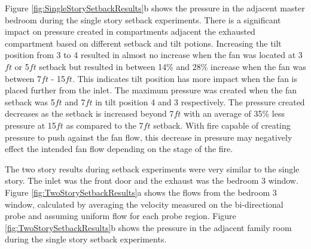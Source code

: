 \documentclass{article}
\begin{document}
Figure \ref{fig:SingleStorySetbackResults}b shows the pressure in the adjacent master bedroom during the single story setback experiments. There is a significant impact on pressure created in compartments adjacent the exhausted compartment based on different setback and tilt potions. Increasing the tilt position from 3 to 4 resulted in almost no increase when the fan was located at 3$ft$ or 5$ft$ setback but resulted in between 14\% and 28\% increase when the fan was between 7$ft$ - 15$ft$. This indicates tilt position has more impact when the fan is placed further from the inlet. The maximum pressure was created when the fan setback was 5$ft$ and 7$ft$ in tilt position 4 and 3 respectively. The pressure created decreases as the setback is increased beyond 7$ft$ with an average of 35\% less pressure at 15$ft$ as compared to the 7$ft$ setback. With fire capable of creating pressure to push against the fan flow, this decrease in pressure may negatively effect the intended fan flow depending on the stage of the fire. 

The two story results during setback experiments were very similar to the single story. The inlet was the front door and the exhaust was the bedroom 3 window. Figure \ref{fig:TwoStorySetbackResults}a shows the flows from the bedroom 3 window, calculated by averaging the velocity measured on the bi-directional probe and assuming uniform flow for each probe region. Figure \ref{fig:TwoStorySetbackResults}b shows the pressure in the adjacent family room during the single story setback experiments.
\end{document}
